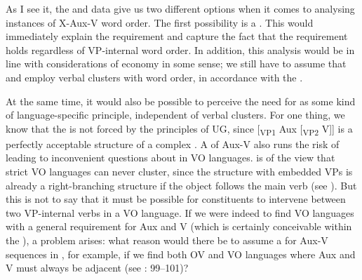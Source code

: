\documentclass[output=paper, colorlinks, citecolor=brown]{langscibook}
\begin{document}
\ea {}
\label{ex:sangfelt:32}

\z 
\z


As I see it, the  and  data give us two different options when it comes to analysing instances of X-Aux-V word order. The first possibility is a . This would immediately explain the  requirement and capture the fact that the requirement holds regardless of VP-internal word order. In addition, this analysis would be in line with considerations of economy in some sense; we still have to assume that  and  employ verbal clusters with  word order, in accordance with the . 

At the same time, it would also be possible to perceive the need for  as some kind of language-specific principle, independent of verbal clusters. For one thing, we know that the  is not forced by the principles of UG, since [\textsubscript{VP1} Aux [\textsubscript{VP2} V]] is a perfectly acceptable structure of a complex . A  of Aux-V also runs the risk of leading to inconvenient questions about  in VO languages. \citet[343]{Haider2010} is of the view that strict VO languages can never cluster, since the structure with embedded VPs is already a  right-branching structure if the object follows the main verb (see ). But this is not to say that it must be possible for constituents to intervene between two VP-internal verbs in a VO language. If we were indeed to find VO languages with a general  requirement for Aux and V (which is certainly conceivable within the ), a problem arises: what reason would there be to assume a  for Aux-V sequences in , for example, if we find both OV and VO languages where Aux and V must always be adjacent (see \citealt{Sheehan2017Final}: 99–101)?
\end{document}
